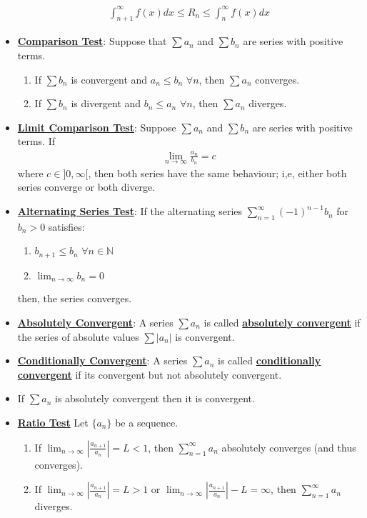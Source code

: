 \documentclass[11pt]{article}
\newcommand{\dfn}[1]{\underline{\textbf{#1}}}
\begin{document}
\begin{itemize}[noitemsep]
	\begin{align}
		\int_{n+1}^\infty f(x) dx \leq R_n \leq \int_n^\infty f(x) dx 	
	\end{align}
	\item \dfn{Comparison Test}: Suppose that $\sum a_n$ and $\sum b_n$ are series with positive terms. 
	\begin{enumerate}[noitemsep]
		\item If $\sum b_n$ is convergent and $a_n \leq b_n $ $\forall n$, then $\sum a_n$ converges. 
		\item If $\sum b_n$ is divergent and $b_n \leq a_n$ $\forall n$, then $\sum a_n$ diverges. 
	\end{enumerate}
	\item \dfn{Limit Comparison Test}: Suppose $\sum a_n$ and $\sum b_n$ are series with positive terms. If 
	\begin{align*}
		\lim_{n \rightarrow \infty} \frac{a_n}{b_n} = c
	\end{align*}
	where $c \in ]0, \infty[$, then both series have the same behaviour; i,e, either both series converge or both diverge. 
	\item \dfn{Alternating Series Test}: If the alternating series $\sum_{n=1}^\infty (-1)^{n-1} b_n$ for $b_n > 0$ satisfies: 
	\begin{enumerate}[noitemsep]
		\item $b_{n+1} \leq b_n$ $\forall n \in \mathbb{N}$
		\item $\lim_{n \rightarrow \infty} b_n = 0$
	\end{enumerate}
	then, the series converges. 
	\item \dfn{Absolutely Convergent}: A series $\sum a_n$ is called \dfn{absolutely convergent} if the series of absolute values $\sum |a_n|$ is convergent. 
	\item \dfn{Conditionally Convergent}: A series $\sum a_n$ is called \dfn{conditionally convergent} if its convergent but not absolutely convergent. 
	\item If $\sum a_n$ is absolutely convergent then it is convergent.
	\item \dfn{Ratio Test} Let $\{ a_n \}$ be a sequence.
	\begin{enumerate}[noitemsep]
		\item If $\lim_{n \rightarrow \infty} \left| \frac{a_{n+1}}{a_n} \right| = L < 1$, then $\sum_{n=1}^\infty a_n $ absolutely converges (and thus converges).
		\item If $\lim_{n \rightarrow \infty} \left| \frac{a_{n+1}}{a_n} \right| = L > 1$ or $\lim_{n \rightarrow \infty} \left| \frac{a_{n+1}}{a_n} \right| - L = \infty $, then $\sum_{n=1}^\infty a_n $ diverges. 

\end{enumerate}
\end{itemize}
\end{document}
